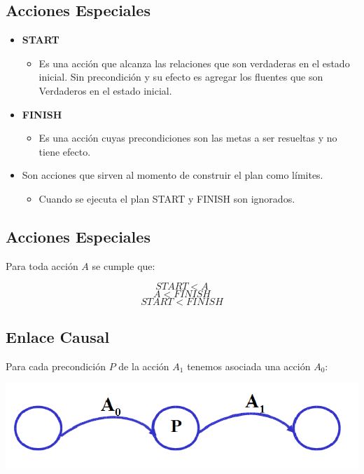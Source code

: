 \documentclass[11pt]{article}
\begin{document}
\subsection*{Acciones Especiales}
\label{sec:org00a47f4}
\begin{itemize}
\item \textbf{{\color{green}START}}
\begin{itemize}
\item Es una acción que alcanza las relaciones que son verdaderas en
el estado inicial. Sin precondición y su efecto es agregar los
fluentes que son Verdaderos en el estado inicial.
\end{itemize}
\item \textbf{{\color{green}FINISH}}
\begin{itemize}
\item Es una acción cuyas precondiciones son las metas a ser
resueltas y no tiene efecto.
\end{itemize}
\item Son acciones que sirven al momento de construir el plan como límites.
\begin{itemize}
\item Cuando se ejecuta el plan START y FINISH son ignorados.
\end{itemize}
\end{itemize}



\subsection*{Acciones Especiales}
\label{sec:org1462794}

Para toda acción \(A\) se cumple que: 

\[START< A\]
\[A< FINISH\]
\[START< FINISH\]

\subsection*{Enlace Causal}
\label{sec:org2074196}

Para cada precondición \(P\) de la acción \(A_1\) tenemos asociada una  acción \(A_0\):

\begin{center}
\includegraphics[width=.9\linewidth]{imagenes/EnlaceCausal.png}
\end{center}
\end{document}
